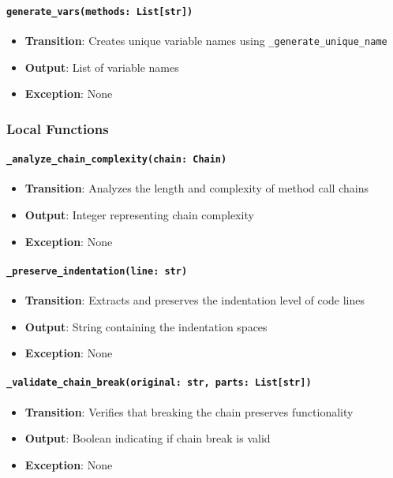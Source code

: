 \documentclass[12pt, titlepage]{article}
\begin{document}
\paragraph{\texttt{generate\_vars(methods: List[str])}}
\begin{itemize}
  \item \textbf{Transition}: Creates unique variable names using \texttt{\_generate\_unique\_name}
  \item \textbf{Output}: List of variable names
  \item \textbf{Exception}: None
\end{itemize}

\subsubsection{Local Functions}

\paragraph{\texttt{\_analyze\_chain\_complexity(chain: Chain)}}
\begin{itemize}
  \item \textbf{Transition}: Analyzes the length and complexity of method call chains
  \item \textbf{Output}: Integer representing chain complexity
  \item \textbf{Exception}: None
\end{itemize}

\paragraph{\texttt{\_preserve\_indentation(line: str)}}
\begin{itemize}
  \item \textbf{Transition}: Extracts and preserves the indentation level of code lines
  \item \textbf{Output}: String containing the indentation spaces
  \item \textbf{Exception}: None
\end{itemize}

\paragraph{\texttt{\_validate\_chain\_break(original: str, parts: List[str])}}
\begin{itemize}
  \item \textbf{Transition}: Verifies that breaking the chain preserves functionality
  \item \textbf{Output}: Boolean indicating if chain break is valid
  \item \textbf{Exception}: None
\end{itemize}
\end{document}
